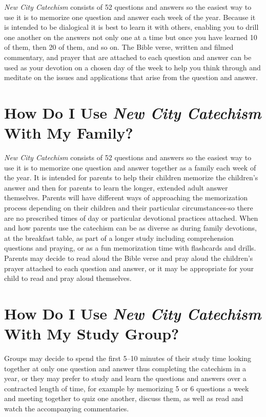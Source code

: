 \documentclass[]{memoir}
\begin{document}
\emph{New City Catechism}\/ consists of 52 questions and answers so the easiest way to use it is to memorize one question and answer each week of the year. Because it is intended to be dialogical it is best to learn it with others, enabling you to drill one another on the answers not only one at a time but once you have learned 10 of them, then 20 of them, and so on. The Bible verse, written and filmed commentary, and prayer that are attached to each question and answer can be used as your devotion on a chosen day of the week to help you think through and meditate on the issues and applications that arise from the question and answer.

\section[How Do I Use {\em New City Catechism}\/ With My Family?][{\em New City Catechism}\/ With A Family]{How Do I Use {\em New City Catechism}\/ With My Family?}

\emph{New City Catechism}\/ consists of 52 questions and answers so the easiest way to use it is to memorize one question and answer together as a family each week of the year. It is intended for parents to help their children memorize the children's answer and then for parents to learn the longer, extended adult answer themselves. Parents will have different ways of approaching the memorization process depending on their children and their particular circumstances-so there are no prescribed times of day or particular devotional practices attached. When and how parents use the catechism can be as diverse as during family devotions, at the breakfast table, as part of a longer study including comprehension questions and praying, or as a fun memorization time with flashcards and drills. Parents may decide to read aloud the Bible verse and pray aloud the children's prayer attached to each question and answer, or it may be appropriate for your child to read and pray aloud themselves.

\section[How Do I Use {\em New City Catechism}\/ With My Study Group?][{\em New City Catechism}\/ With A Study Group]{How Do I Use {\em New City Catechism}\/ With My Study Group?}

Groups may decide to spend the first 5--10 minutes of their study time looking together at only one question and answer thus completing the catechism in a year, or they may prefer to study and learn the questions and answers over a contracted length of time, for example by memorizing 5 or 6 questions a week and meeting together to quiz one another, discuss them, as well as read and watch the accompanying commentaries.
\end{document}
